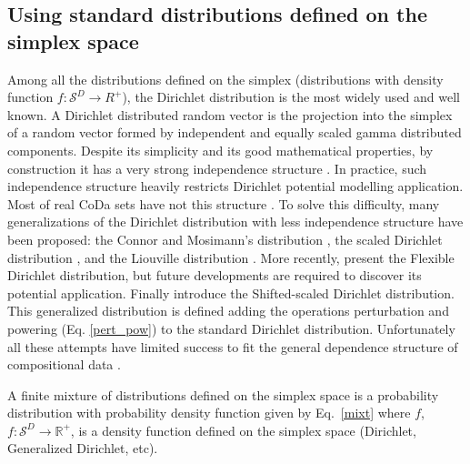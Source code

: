 \documentclass[10pt, a4paper]{article}
\begin{document}
\subsection{Using standard distributions defined on the simplex space}
\label{simplex_section}

\noindent Among all the distributions defined on the simplex (distributions with density function $f: \mathcal{S}^D\rightarrow R^+$), the Dirichlet distribution is the most widely used and well known. 
A Dirichlet distributed random vector is the projection into the simplex of a random vector formed by independent and equally scaled gamma distributed components. 
Despite its simplicity and its good mathematical properties, by construction it has a very strong independence structure \citep{aitchison1986statistical}. 
In practice, such independence structure heavily restricts Dirichlet potential modelling application. Most of real CoDa sets have
not this structure \citep{aitchison1986statistical}. To solve this difficulty, many generalizations of the Dirichlet distribution with less
independence structure have been proposed: the Connor and Mosimann's distribution
\citep{Connor:1969}, the scaled Dirichlet distribution \citep{aitchison1986statistical},  and the Liouville distribution \citep{rayens1994dependence}.  More recently, \cite{ongaro2008new} present the Flexible Dirichlet distribution, but future
developments are required to discover its potential application. Finally \cite{monti2011shifted} introduce the Shifted-scaled Dirichlet distribution. This generalized distribution is defined adding the operations
perturbation and powering (Eq. \ref{pert_pow}) to the standard Dirichlet distribution. Unfortunately all these attempts
have limited success to fit the general dependence structure of compositional data \citep{mateu2013normal}.

A finite mixture of distributions defined on the simplex space is a probability distribution with probability density function given by Eq.~\ref{mixt} where $f$, $f: \mathcal{S}^D \rightarrow \mathbb{R}^+$, is a density function defined on the simplex space (Dirichlet, Generalized Dirichlet, etc).
\end{document}
